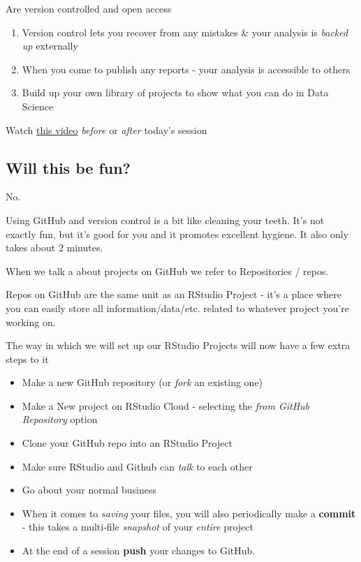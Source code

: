 \documentclass[
]{book}
\begin{document}
Are version controlled and open access

\begin{enumerate}
\def\labelenumi{\arabic{enumi})}
\setcounter{enumi}{2}
\item
  Version control lets you recover from any mistakes \& your analysis is \emph{backed up} externally
\item
  When you come to publish any reports - your analysis is accessible to others
\item
  Build up your own library of projects to show what you can do in Data Science
\end{enumerate}

Watch \href{https://www.youtube.com/watch?v=w3jLJU7DT5E}{this video} \emph{before} or \emph{after} today's session

\hypertarget{will-this-be-fun}{%
\subsection{Will this be fun?}\label{will-this-be-fun}}

No.

Using GitHub and version control is a bit like cleaning your teeth. It's not exactly fun, but it's good for you and it promotes excellent hygiene. It also only takes about 2 minutes.

When we talk a about projects on GitHub we refer to Repositories / repos.

Repos on GitHub are the same unit as an RStudio Project - it's a place where you can easily store all information/data/etc. related to whatever project you're working on.

The way in which we will set up our RStudio Projects will now have a few extra steps to it

\begin{itemize}
\item
  Make a new GitHub repository (or \emph{fork} an existing one)
\item
  Make a New project on RStudio Cloud - selecting the \emph{from GitHub Repository} option
\item
  Clone your GitHub repo into an RStudio Project
\item
  Make sure RStudio and Github can \emph{talk} to each other
\item
  Go about your normal business
\item
  When it comes to \emph{saving} your files, you will also periodically make a \textbf{commit} - this takes a multi-file \emph{snapshot} of your \emph{entire} project
\item
  At the end of a session \textbf{push} your changes to GitHub.
\end{itemize}
\end{document}
